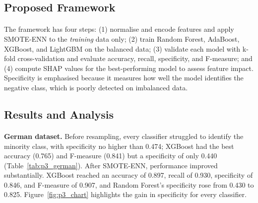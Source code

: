 \documentclass[12pt,a4paper,final]{extreport}
\begin{document}
\subsection{Proposed Framework}

\paragraph{} The framework has four steps: (1) normalise and encode features and apply SMOTE-ENN to the \emph{training} data only; (2) train Random Forest, AdaBoost, XGBoost, and LightGBM on the balanced data; (3) validate each model with k-fold cross-validation and evaluate accuracy, recall, specificity, and F-measure; and (4) compute SHAP values for the best-performing model to assess feature impact. Specificity is emphasised because it measures how well the model identifies the negative class, which is poorly detected on imbalanced data.

\subsection{Results and Analysis}

\paragraph{} \textbf{German dataset.} Before resampling, every classifier struggled to identify the minority class, with specificity no higher than 0.474; XGBoost had the best accuracy (0.765) and F-measure (0.841) but a specificity of only 0.440 (Table~\ref{tab:p3_german}). After SMOTE-ENN, performance improved substantially. XGBoost reached an accuracy of 0.897, recall of 0.930, specificity of 0.846, and F-measure of 0.907, and Random Forest's specificity rose from 0.430 to 0.825. Figure~\ref{fig:p3_chart} highlights the gain in specificity for every classifier.
\end{document}
